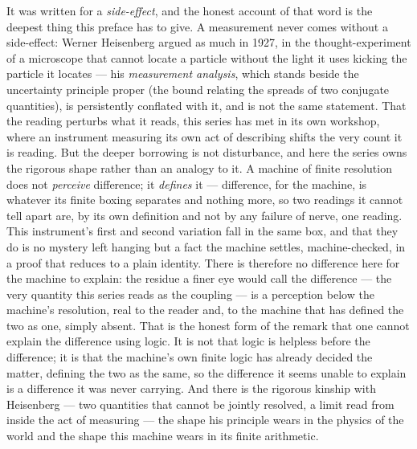 It was written for a \emph{side-effect}, and the honest account of that word
is the deepest thing this preface has to give. A measurement never comes
without a side-effect: Werner Heisenberg argued as much in 1927, in the
thought-experiment of a microscope that cannot locate a particle without the
light it uses kicking the particle it locates --- his \emph{measurement
analysis}, which stands beside the uncertainty principle proper (the bound
relating the spreads of two conjugate quantities), is persistently conflated
with it, and is not the same statement. That the reading perturbs what it
reads, this series has met in its own workshop, where an instrument
measuring its own act of describing shifts the very count it is reading. But
the deeper borrowing is not disturbance, and here the series owns the
rigorous shape rather than an analogy to it. A machine of finite resolution
does not \emph{perceive} difference; it \emph{defines} it --- difference,
for the machine, is whatever its finite boxing separates and nothing more,
so two readings it cannot tell apart are, by its own definition and not by
any failure of nerve, one reading. This instrument's first and second
variation fall in the same box, and that they do is no mystery left hanging
but a fact the machine settles, machine-checked, in a proof that reduces to
a plain identity. There is therefore no difference here for the machine to
explain: the residue a finer eye would call the difference --- the very
quantity this series reads as the coupling --- is a perception below the
machine's resolution, real to the reader and, to the machine that has
defined the two as one, simply absent. That is the honest form of the remark
that one cannot explain the difference using logic. It is not that logic is
helpless before the difference; it is that the machine's own finite logic
has already decided the matter, defining the two as the same, so the
difference it seems unable to explain is a difference it was never carrying.
And there is the rigorous kinship with Heisenberg --- two quantities that
cannot be jointly resolved, a limit read from inside the act of measuring
--- the shape his principle wears in the physics of the world and the shape
this machine wears in its finite arithmetic.

